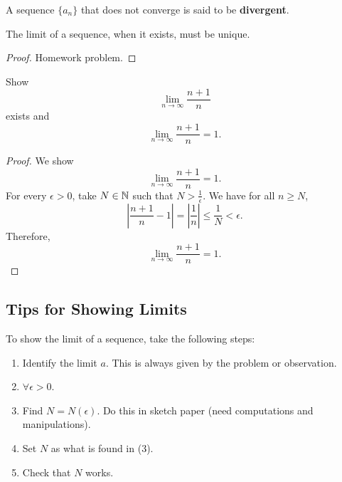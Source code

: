 \begin{definition}
  A sequence $\{a_n\}$ that does not converge is said
  to be \textbf{divergent}.
\end{definition}

\begin{theorem}
  The limit of a sequence, when it exists, must be
  unique.
\end{theorem}

\begin{proof}
  Homework problem.
\end{proof}

\begin{exercise}
  Show
  \[\lim_{n \to \infty} \frac{n+1}{n}\]
  exists and
  \[\lim_{n \to \infty} \frac{n+1}{n} = 1.\]
\end{exercise}

\begin{proof}
  We show
  \[\lim_{n \to \infty} \frac{n+1}{n} = 1.\]
  For every $\epsilon > 0$, take $N \in \mathbb{N}$ such that
  $N > \frac{1}{\epsilon}$. We have for all $n \ge N$,
  \[
  \left|\frac{n+1}{n} - 1\right| = \left|\frac{1}{n}\right| \le \frac{1}{N} < \epsilon
  .\]
  Therefore,
  \[
    \lim_{n \to \infty} \frac{n+1}{n} = 1
  .\]
\end{proof}

\subsection{Tips for Showing Limits}
To show the limit of a sequence, take the following steps:
\begin{enumerate}
  \item Identify the limit $a$. This is always given
    by the problem or observation.
  \item $\forall \epsilon > 0$.
  \item Find $N = N(\epsilon)$. Do this in sketch paper
    (need computations and manipulations).
  \item Set $N$ as what is found in (3).
  \item Check that $N$ works.
\end{enumerate}
